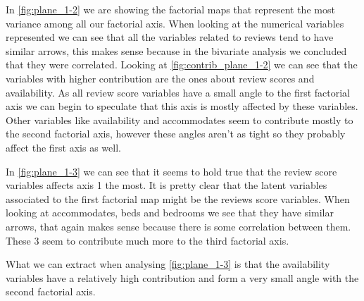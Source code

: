 \newcommand{\contrib}[2]{
    \begin{figure}[H]
        \centering
        \texttt{[image: pca\_fact-plane\_\#1\_\#2-contrib]}
        \caption{PCA variable contributions of plane #1 vs #2}%
        \label{fig:contrib_plane_#1-#2}
    \end{figure}
}

\newcommand{\categorica}[4]{
    \begin{figure}[H]
        \centering
        \texttt{[image: pca\_fact-\#3-plane\_\#1\_\#2]}
        \caption{PCA variable contributions of #4 in plane #1 vs #2}%
        \label{fig:cat-#3-plane-#1-#2}
    \end{figure}
}



In \cref{fig:plane_1-2} we are showing the factorial maps that represent the most variance among all our factorial axis. When looking at the numerical variables represented we can see that all the variables
related to reviews tend to have similar arrows, this makes sense 
because in the bivariate analysis we concluded that they were correlated.
Looking at \cref{fig:contrib_plane_1-2} we can see that the variables
with higher contribution are the ones about review scores and availability. As all review score variables have a small angle to the first factorial axis we can begin to speculate that this axis is 
mostly affected by these variables. Other variables like availability
and accommodates seem to contribute mostly to the second factorial axis, however these angles aren't as tight so they probably affect the first axis as well.


In \cref{fig:plane_1-3} we can see that it seems to hold true that 
the review score variables affects axis 1 the most. It is pretty clear that the latent variables associated to the 
first factorial map might be the reviews score variables. When looking at accommodates, beds and 
bedrooms we see that they have similar arrows, that again makes sense because there is some 
correlation between them. These 3 seem to contribute much more to the third factorial axis.





What we can extract when analysing \cref{fig:plane_1-3} is that the availability variables have 
a relatively high contribution and form a very small angle with the second factorial axis.

